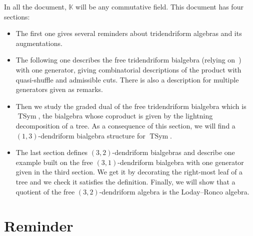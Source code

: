 \documentclass[10pt,a4paper]{amsart}
\numberwithin{equation}{section}
\theoremstyle{definition}
\theoremstyle{plain}
\newcommand{\K}{\mathbb{K}}
\DeclareMathOperator{\TSym}{TSym}
\begin{document}
In all the document, $\K$ will be any commutative field. This document has four sections:
\begin{itemize}\itemsep=0pt
	\item The first one gives several reminders about tridendriform algebras and its augmentations.
	\item The following one describes the free tridendriform bialgebra (relying on~\cite{Trial}) with one generator, giving combinatorial descriptions of the product with quasi-shuffle and admissible cuts. There is also a description for multiple generators given as remarks.
	\item Then we study the graded dual of the free tridendriform bialgebra which is $\TSym$, the bialgebra whose coproduct is given by the lightning decomposition of a tree. As a consequence of this section, we will find a $(1,3)$-dendriform bialgebra structure for $\TSym$.
	\item The last section defines $(3,2)$-dendriform bialgebras and describe one example built on the free $(3,1)$-dendriform bialgebra with one generator given in the third section. We get it by decorating the right-most leaf of a tree and we check it satisfies the definition. Finally, we will show that a quotient of the free $(3,2)$-dendriform algebra is the Loday--Ronco algebra.
\end{itemize}

\section{Reminder}
\end{document}
